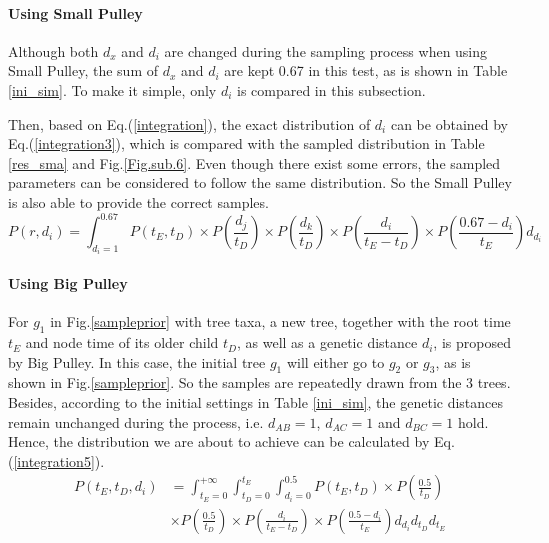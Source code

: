 \documentclass{bmcart}
\begin{document}
\paragraph*{Using Small Pulley}

Although both ${d_x}$ and ${d_i}$ are changed during the sampling process when using Small Pulley, the sum of ${d_x}$ and ${d_i}$ are kept 0.67 in this test, as is shown in Table \ref{ini_sim}. To make it simple, only ${d_i}$ is compared in this subsection.

Then, based on Eq.(\ref{integration}), the exact distribution of ${d_i}$ can be obtained by Eq.(\ref{integration3}), which is compared with the sampled distribution in Table \ref{res_sma} and Fig.\ref{Fig.sub.6}. Even though there exist some errors, the sampled parameters can be considered to follow the same distribution. So the Small Pulley is also able to provide the correct samples.
\begin{equation}\label{integration3}
P(r,{d_i}) = \int_{{d_i} = 1}^{0.67} {P({t_E},{t_D}) \times P(\frac{{{d_j}}}{{{t_D}}}) \times P(\frac{{{d_k}}}{{{t_D}}}) \times P(\frac{{{d_i}}}{{{t_E} - {t_D}}}) \times P(\frac{{0.67 - {d_i}}}{{{t_E}}}){d_{d_i}}}
\end{equation}

\paragraph*{Using Big Pulley}

For $g_1$ in Fig.\ref{sampleprior} with tree taxa, a new tree, together with the root time $t_E$ and node time of its older child $t_D$, as well as a genetic distance $d_i$, is proposed by Big Pulley. In this case, the initial tree $g_1$ will either go to $g_2$ or $g_3$, as is shown in Fig.\ref{sampleprior}.  So the samples are repeatedly drawn from the 3 trees. Besides, according to the initial settings in Table \ref{ini_sim}, the genetic distances remain unchanged during the process, i.e. $d_{AB} = 1$, $d_{AC}  = 1$ and $d_{BC} = 1$ hold. Hence, the distribution we are about to achieve can be calculated by Eq.(\ref{integration5}).
\begin{equation}
\label{integration5}
\begin{aligned}
P({t_E},{t_D},{d_i}) &= \int_{{t_E} = 0}^{ + \infty } {\int_{{t_D} = 0}^{{t_E}} {\int_{{d_i} = 0}^{0.5} {P({t_E},{t_D})} } \times P(\frac{{0.5}}{{{t_D}}})}  \\&\times P(\frac{{0.5}}{{{t_D}}}) \times P(\frac{{{d_i}}}{{{t_E} - {t_D}}}) \times P(\frac{{0.5 - {d_i}}}{{{t_E}}}){d_{d_i}}{d_{t_D}}{d_{t_E}}
\end{aligned}
\end{equation}
\end{document}
